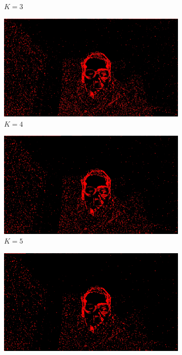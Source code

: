 \documentclass[paper=a4, fontsize=10pt]{scrartcl}	%
\begin{document}
\begin{figure}[H]
\begin{subfigure}{0.2\textwidth}
		\caption{$K=3$}
	\end{subfigure}%
	\begin{subfigure}{0.2\textwidth}
		\includegraphics[width=\linewidth]{images/heatmap/img_gaus/img_man_red_g4.jpg}
		\caption{$K=4$}
	\end{subfigure}%
	\begin{subfigure}{0.2\textwidth}
		\includegraphics[width=\linewidth]{images/heatmap/img_gaus/img_man_red_g5.jpg}
		\caption{$K=5$}
	\end{subfigure}%
	\begin{subfigure}{0.2\textwidth}
		\includegraphics[width=\linewidth]{images/heatmap/img_gaus/img_man_red_g6.jpg}

\end{subfigure}
\end{figure}
\end{document}
